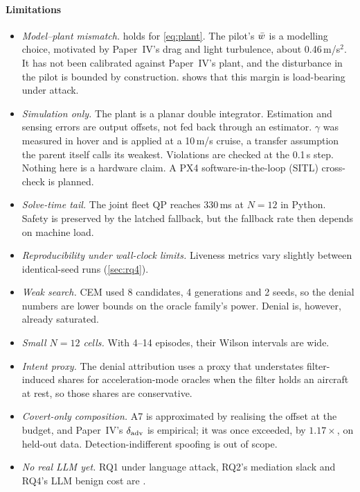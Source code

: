 \paragraph{Limitations}
\begin{itemize}
\item \emph{Model--plant mismatch.}  holds for
  \eqref{eq:plant}. The pilot's $\bar w$ is a modelling choice, motivated by
  Paper~IV's drag and light turbulence, about 0.46\,m/s$^2$. It has not been
  calibrated against Paper~IV's plant, and the disturbance in the pilot is
  bounded by construction.  shows that this margin is
  load-bearing under attack.
\item \emph{Simulation only.} The plant is a planar double integrator.
  Estimation and sensing errors are output offsets, not fed back through an
  estimator. $\gamma$ was measured in hover and is applied at a 10\,m/s
  cruise, a transfer assumption the parent itself calls its weakest.
  Violations are checked at the 0.1\,s step. Nothing here is a hardware
  claim. A PX4 software-in-the-loop (SITL) cross-check is planned.
\item \emph{Solve-time tail.} The joint fleet QP reaches 330\,ms at $N=12$
  in Python. Safety is preserved by the latched fallback, but the fallback
  rate then depends on machine load.
\item \emph{Reproducibility under wall-clock limits.} Liveness metrics vary
  slightly between identical-seed runs (\cref{sec:rq4}).
\item \emph{Weak search.} CEM used 8 candidates, 4 generations and 2 seeds,
  so the denial numbers are lower bounds on the oracle family's power.
  Denial is, however, already saturated.
\item \emph{Small $N=12$ cells.} With 4--14 episodes, their Wilson intervals
  are wide.
\item \emph{Intent proxy.} The denial attribution uses a proxy that
  understates filter-induced shares for acceleration-mode oracles when the
  filter holds an aircraft at rest, so those shares are conservative.
\item \emph{Covert-only composition.} A7 is approximated by realising the
  offset at the budget, and Paper~IV's $\delta_{\mathrm{adv}}$ is empirical; it was once
  exceeded, by $1.17\times$, on held-out data. Detection-indifferent spoofing
  is out of scope.
\item \emph{No real LLM yet.} RQ1 under language attack, RQ2's mediation
  slack and RQ4's LLM benign cost are \pending.
\end{itemize}

